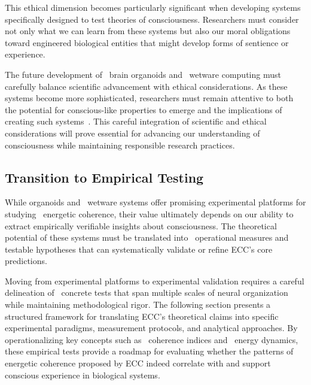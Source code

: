 This ethical dimension becomes particularly significant when developing systems specifically designed to test theories of consciousness. Researchers must consider not only what we can learn from these systems but also our moral obligations toward engineered biological entities that might develop forms of sentience or experience.

The future development of~ brain organoids and~ wetware computing must carefully balance scientific advancement with ethical considerations. As these systems become more sophisticated, researchers must remain attentive to both the potential for conscious-like properties to emerge and the implications of creating such systems~\cite{Lavazza2018, Farahany2018}. This careful integration of scientific and ethical considerations will prove essential for advancing our understanding of consciousness while maintaining responsible research practices.

\subsection*{Transition to Empirical Testing}

While organoids and~ wetware systems offer promising experimental platforms for studying~ energetic coherence, their value ultimately depends on our ability to extract empirically verifiable insights about consciousness. The theoretical potential of these systems must be translated into~ operational measures and~ testable hypotheses that can systematically validate or refine ECC's core predictions.

Moving from experimental platforms to experimental validation requires a careful delineation of~ concrete tests that span multiple scales of neural organization while maintaining methodological rigor. The following section presents a structured framework for translating ECC's theoretical claims into specific experimental paradigms, measurement protocols, and analytical approaches. By operationalizing key concepts such as~ coherence indices and~ energy dynamics, these empirical tests provide a roadmap for evaluating whether the patterns of~ energetic coherence proposed by ECC indeed correlate with and support~ conscious experience in biological systems.
